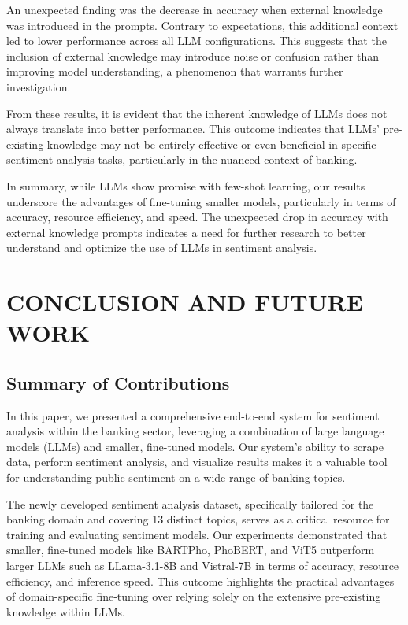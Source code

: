 {An unexpected finding was the decrease in accuracy when external knowledge was introduced in the prompts. Contrary to expectations, this additional context led to lower performance across all LLM configurations. This suggests that the inclusion of external knowledge may introduce noise or confusion rather than improving model understanding, a phenomenon that warrants further investigation.

From these results, it is evident that the inherent knowledge of LLMs does not always translate into better performance. This outcome indicates that LLMs' pre-existing knowledge may not be entirely effective or even beneficial in specific sentiment analysis tasks, particularly in the nuanced context of banking.

In summary, while LLMs show promise with few-shot learning, our results underscore the advantages of fine-tuning smaller models, particularly in terms of accuracy, resource efficiency, and speed. The unexpected drop in accuracy with external knowledge prompts indicates a need for further research to better understand and optimize the use of LLMs in sentiment analysis.

\section{CONCLUSION AND FUTURE WORK}
\subsection{Summary of Contributions}
In this paper, we presented a comprehensive end-to-end system for sentiment analysis within the banking sector, leveraging a combination of large language models (LLMs) and smaller, fine-tuned models. Our system's ability to scrape data, perform sentiment analysis, and visualize results makes it a valuable tool for understanding public sentiment on a wide range of banking topics.

The newly developed sentiment analysis dataset, specifically tailored for the banking domain and covering 13 distinct topics, serves as a critical resource for training and evaluating sentiment models. Our experiments demonstrated that smaller, fine-tuned models like BARTPho, PhoBERT, and ViT5 outperform larger LLMs such as LLama-3.1-8B and Vistral-7B in terms of accuracy, resource efficiency, and inference speed. This outcome highlights the practical advantages of domain-specific fine-tuning over relying solely on the extensive pre-existing knowledge within LLMs.

}
